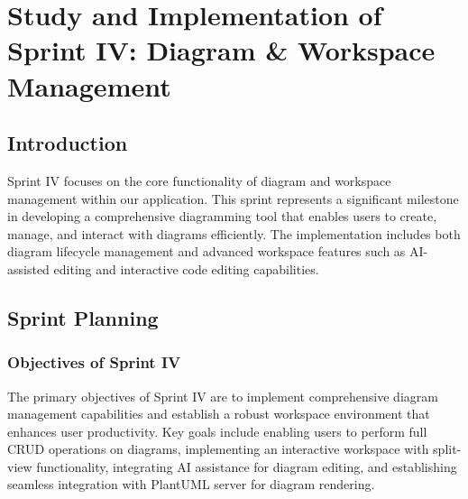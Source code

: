 \chapter[Sprint IV]{Study and Implementation of Sprint IV: Diagram \& Workspace Management}


\section{Introduction}
Sprint IV focuses on the core functionality of diagram and workspace management within our application. This sprint represents a significant milestone in developing a comprehensive diagramming tool that enables users to create, manage, and interact with diagrams efficiently. The implementation includes both diagram lifecycle management and advanced workspace features such as AI-assisted editing and interactive code editing capabilities.

\section{Sprint Planning}

\subsection{Objectives of Sprint IV}
The primary objectives of Sprint IV are to implement comprehensive diagram management capabilities and establish a robust workspace environment that enhances user productivity. Key goals include enabling users to perform full CRUD operations on diagrams, implementing an interactive workspace with split-view functionality, integrating AI assistance for diagram editing, and establishing seamless integration with PlantUML server for diagram rendering.


